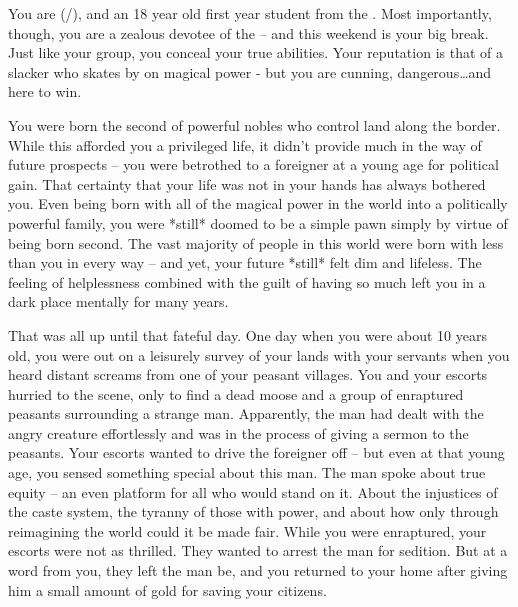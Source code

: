 \documentclass[char]{GL2020}
\begin{document}
\name{\cChupStudent{}}
 
 
 
You are \cChupStudent{} (\cChupStudent{\they}/\cChupStudent{\them}), and an 18 year old first year student from the \pFarm{}. Most importantly, though, you are a zealous devotee of the \pGoaties{} -- and this weekend is your big break. Just like your group, you conceal your true abilities. Your reputation is that of a slacker who skates by on \cChupStudent{\their} magical power - but you are cunning, dangerous\ldots and here to win.
 
 
You were born the second \cChupStudent{\child} of powerful nobles who control land along the \pTech{} border. While this afforded you a privileged life, it didn’t provide much in the way of future prospects -- you were betrothed to a foreigner at a young age for political gain. That certainty that your life was not in your hands has always bothered you. Even being born with all of the magical power in the world into a politically powerful family, you were *still* doomed to be a simple pawn simply by virtue of being born second. The vast majority of people in this world were born with less than you in every way -- and yet, your future *still* felt dim and lifeless. The feeling of helplessness combined with the guilt of having so much left you in a dark place mentally for many years.

That was all up until that fateful day. One day when you were about 10 years old, you were out on a leisurely survey of your lands with your servants when you heard distant screams from one of your peasant villages. You and your escorts hurried to the scene, only to find a dead moose and a group of enraptured peasants surrounding a strange man. Apparently, the man had dealt with the angry creature effortlessly and was in the process of giving a sermon to the peasants. Your escorts wanted to drive the foreigner off -- but even at that young age, you sensed something special about this man. The man spoke about true equity -- an even platform for all who would stand on it. About the injustices of the caste system, the tyranny of those with power, and about how only through reimagining the world could it be made fair. While you were enraptured, your escorts were not as thrilled. They wanted to arrest the man for sedition. But at a word from you, they left the man be, and you returned to your home after giving him a small amount of gold for saving your citizens.
 
\end{document}

